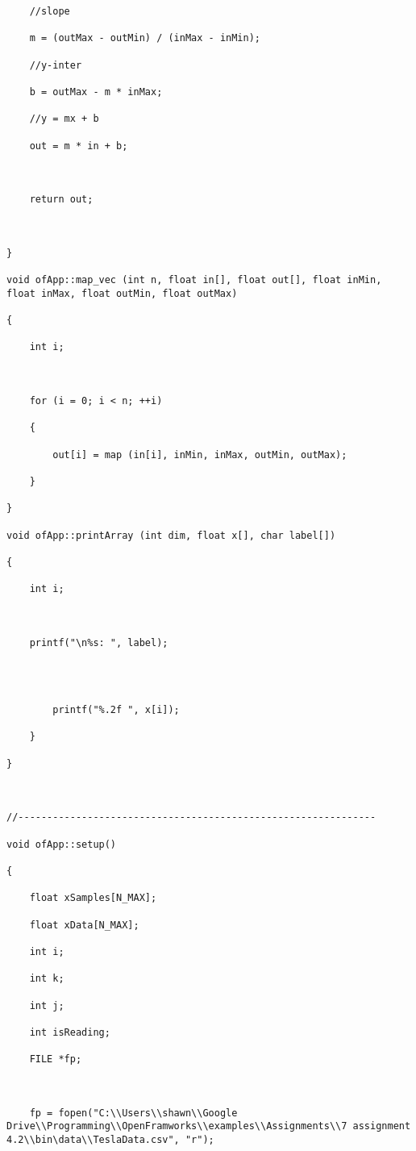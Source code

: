 \documentclass[letterpaper, 24pt, final, onecolumn, titlepage] {article}
\begin{document}
\begin{lstlisting}
    //slope

    m = (outMax - outMin) / (inMax - inMin);

    //y-inter

    b = outMax - m * inMax;

    //y = mx + b

    out = m * in + b;



    return out;



}

void ofApp::map_vec (int n, float in[], float out[], float inMin, float inMax, float outMin, float outMax)

{

    int i;



    for (i = 0; i < n; ++i)

    {

        out[i] = map (in[i], inMin, inMax, outMin, outMax);

    }

}

void ofApp::printArray (int dim, float x[], char label[])

{

    int i;



    printf("\n%s: ", label);




        printf("%.2f ", x[i]);

    }

}



//--------------------------------------------------------------

void ofApp::setup()

{

    float xSamples[N_MAX];

    float xData[N_MAX];

    int i;

    int k;

    int j;

    int isReading;

    FILE *fp;



    fp = fopen("C:\\Users\\shawn\\Google Drive\\Programming\\OpenFramworks\\examples\\Assignments\\7 assignment 4.2\\bin\data\\TeslaData.csv", "r");




\end{lstlisting}
\end{document}
